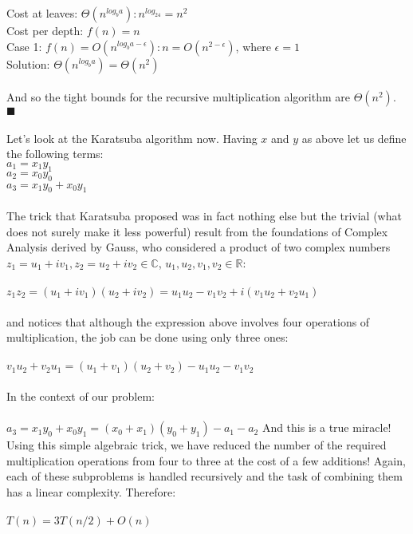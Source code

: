 \documentclass[a4paper]{article}
\begin{document}
Cost at leaves: $\Theta(n^{log_ba}): n^{log_24} = n^2$ \\
Cost per depth: $f(n) = n$ \\
Case 1: $f(n) = O(n^{log_ba-\epsilon}): n = O(n^{2-\epsilon})$, where $\epsilon = 1$\\
Solution: $\Theta(n^{log_ba}) = \Theta(n^2)$ \\ \\
And so the tight bounds for the recursive multiplication algorithm are $\Theta(n^2)$. \\
$\blacksquare$ \\ \\
Let's look at the Karatsuba algorithm now. Having $x$ and $y$ as above let us define the following terms: \\
$a_1 = x_1y_1$ \\
$a_2 = x_0y_0$ \\
$a_3 = x_1y_0 + x_0y_1$\\ \\
The trick that Karatsuba proposed was in fact nothing else but the trivial (what does not surely make it less powerful) result from the foundations of Complex Analysis derived by Gauss, who considered a product of two complex numbers $z_1 = u_1+iv_1, z_2 = u_2 + iv_2 \in \mathbb{C} $, $u_1,u_2,v_1,v_2 \in  \mathbb{R} $: \\ \\
$z_1z_2 = (u_1+iv_1)(u_2 + iv_2) = u_1u_2 - v_1v_2 + i(v_1u_2 + v_2u_1)$\\ \\
and notices that although the expression above involves four operations of multiplication, the job can be done using only three ones: \\ \\
$v_1u_2 + v_2u_1 = (u_1 + v_1)(u_2 + v_2) - u_1u_2 - v_1v_2$ \\ \\
In the context of our problem: \\ \\
$a_3 = x_1y_0 + x_0y_1 = (x_0+x_1)(y_0+y_1) - a_1 - a_2$
And this is a true miracle! Using this simple algebraic trick, we have reduced the number of the required multiplication operations from four to three at the cost of a few additions! Again, each of these subproblems is handled recursively and the task of combining them has a linear complexity. Therefore: \\ \\
$T(n) = 3T(n/2) + O(n)$ \\ \\
\end{document}
